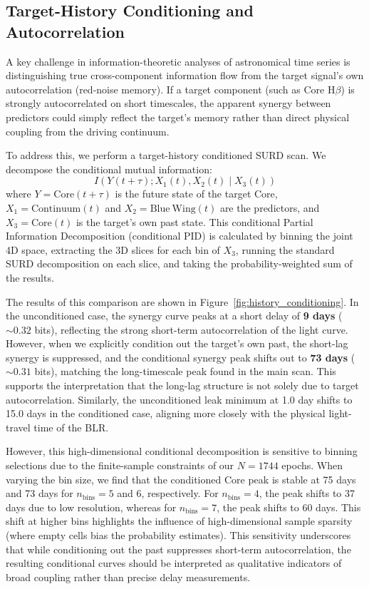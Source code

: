 \documentclass[12pt, a4paper]{article}
\begin{document}
\subsection{Target-History Conditioning and Autocorrelation}
\label{sec:target_history_conditioning}

A key challenge in information-theoretic analyses of astronomical time series is distinguishing true cross-component information flow from the target signal's own autocorrelation (red-noise memory). If a target component (such as Core H\(\beta\)) is strongly autocorrelated on short timescales, the apparent synergy between predictors could simply reflect the target's memory rather than direct physical coupling from the driving continuum.

To address this, we perform a target-history conditioned SURD scan. We decompose the conditional mutual information:
\begin{equation}
I(Y(t+\tau); X_1(t), X_2(t) \mid X_3(t))
\end{equation}
where $Y = \mathrm{Core}(t+\tau)$ is the future state of the target Core, $X_1 = \mathrm{Continuum}(t)$ and $X_2 = \mathrm{Blue\ Wing}(t)$ are the predictors, and $X_3 = \mathrm{Core}(t)$ is the target's own past state. This conditional Partial Information Decomposition (conditional PID) is calculated by binning the joint 4D space, extracting the 3D slices for each bin of $X_3$, running the standard SURD decomposition on each slice, and taking the probability-weighted sum of the results.

The results of this comparison are shown in Figure~\ref{fig:history_conditioning}. In the unconditioned case, the synergy curve peaks at a short delay of \textbf{9 days} ($\sim 0.32$ bits), reflecting the strong short-term autocorrelation of the light curve. However, when we explicitly condition out the target's own past, the short-lag synergy is suppressed, and the conditional synergy peak shifts out to \textbf{73 days} ($\sim 0.31$ bits), matching the long-timescale peak found in the main scan. This supports the interpretation that the long-lag structure is not solely due to target autocorrelation. Similarly, the unconditioned leak minimum at 1.0 day shifts to 15.0 days in the conditioned case, aligning more closely with the physical light-travel time of the BLR.

However, this high-dimensional conditional decomposition is sensitive to binning selections due to the finite-sample constraints of our $N = 1744$ epochs. When varying the bin size, we find that the conditioned Core peak is stable at 75 days and 73 days for $n_{\mathrm{bins}} = 5$ and $6$, respectively. For $n_{\mathrm{bins}} = 4$, the peak shifts to 37 days due to low resolution, whereas for $n_{\mathrm{bins}} = 7$, the peak shifts to 60 days. This shift at higher bins highlights the influence of high-dimensional sample sparsity (where empty cells bias the probability estimates). This sensitivity underscores that while conditioning out the past suppresses short-term autocorrelation, the resulting conditional curves should be interpreted as qualitative indicators of broad coupling rather than precise delay measurements.
\end{document}
